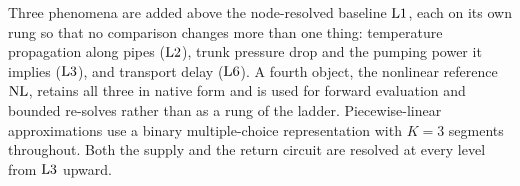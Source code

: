 
Three phenomena are added above the node-resolved baseline $\mathrm{L1}$, each on its own rung so
that no comparison changes more than one thing: temperature propagation along pipes
($\mathrm{L2}$), trunk pressure drop and the pumping power it implies ($\mathrm{L3}$), and transport
delay ($\mathrm{L6}$). A fourth object, the nonlinear reference $\mathrm{NL}$, retains all three in
native form and is used for forward evaluation and bounded re-solves rather than as a rung
of the ladder. Piecewise-linear approximations use a binary multiple-choice representation with $K = 3$ segments
throughout. Both the supply and the return circuit are resolved at every level from
$\mathrm{L3}$ upward.


